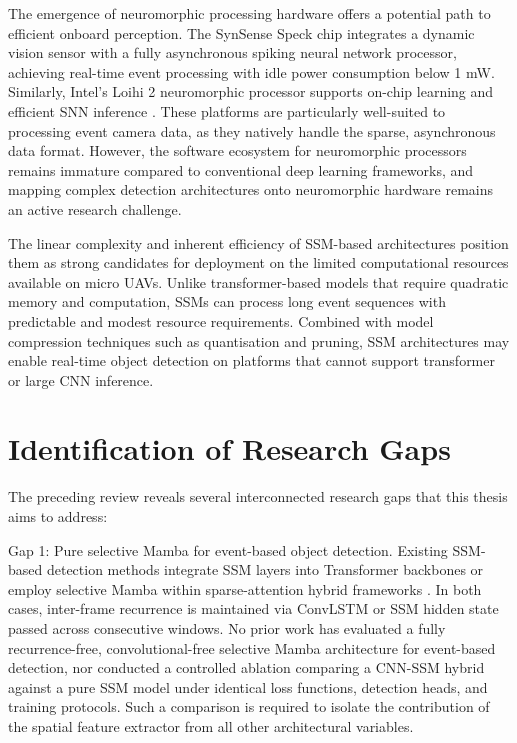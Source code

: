 \documentclass[11pt, a4paper]{report}
\begin{document}
The emergence of neuromorphic processing hardware offers a potential path to efficient onboard perception. The SynSense Speck chip \cite{synsense2026speck} integrates a dynamic vision sensor with a fully asynchronous spiking neural network processor, achieving real-time event processing with idle power consumption below 1 mW. Similarly, Intel's Loihi 2 neuromorphic processor supports on-chip learning and efficient SNN inference \cite{davies2021advancing}. These platforms are particularly well-suited to processing event camera data, as they natively handle the sparse, asynchronous data format. However, the software ecosystem for neuromorphic processors remains immature compared to conventional deep learning frameworks, and mapping complex detection architectures onto neuromorphic hardware remains an active research challenge. 

The linear complexity and inherent efficiency of SSM-based architectures position them as strong candidates for deployment on the limited computational resources available on micro UAVs. Unlike transformer-based models that require quadratic memory and computation, SSMs can process long event sequences with predictable and modest resource requirements. Combined with model compression techniques such as quantisation and pruning, SSM architectures may enable real-time object detection on platforms that cannot support transformer or large CNN inference. 

\section{Identification of Research Gaps}
The preceding review reveals several interconnected research gaps that this thesis aims to address: 

Gap 1: Pure selective Mamba for event-based object detection. Existing SSM-based detection methods integrate SSM layers into Transformer backbones \cite{zubic2024state} or employ selective Mamba within sparse-attention hybrid frameworks \cite{yang2025smamba}. In both cases, inter-frame recurrence is maintained via ConvLSTM or SSM hidden state passed across consecutive windows. No prior work has evaluated a fully recurrence-free, convolutional-free selective Mamba architecture for event-based detection, nor conducted a controlled ablation comparing a CNN-SSM hybrid against a pure SSM model under identical loss functions, detection heads, and training protocols. Such a comparison is required to isolate the contribution of the spatial feature extractor from all other architectural variables. 
\end{document}
